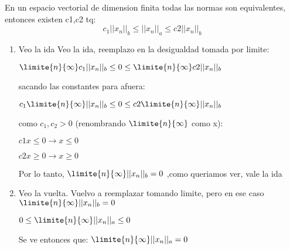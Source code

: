 
\medskip


En un espacio vectorial de dimension finita todas las normas son equivalentes, entonces existen c1,c2 tq:
\begin{equation*}
  c_1||x_n||_b \leq ||x_n||_a \leq c2||x_n||_b
\end{equation*}



\begin{enumerate}[label=(\roman*)]
  \item Veo la ida
  Veo la ida, reemplazo en la desigualdad tomada por limite:

  $\limite{n}{\infty} c_1||x_n||_b \leq 0 \leq \limite{n}{\infty}  c2||x_n||_b $
  
  sacando las constantes para afuera:
  
  $c_1 \limite{n}{\infty} ||x_n||_b \leq 0 \leq  c2 \limite{n}{\infty} ||x_n||_b $
  
  como  $c_1, c_2 > 0$ (renombrando $\limite{n}{\infty}$ como x):
  
  $c1x \leq 0 \rightarrow x \leq 0 $
  
  $c2x \geq 0 \rightarrow x \geq  0 $
  
  Por lo tanto, $\limite{n}{\infty} ||x_n||_b = 0$ ,como queriamos ver, vale la ida

  \item Veo la vuelta.
  Vuelvo a reemplazar tomando limite, pero en ese caso $\limite{n}{\infty} ||x_n||_b = 0$

  $0 \leq \limite{n}{\infty} ||x_n||_a \leq 0$

  Se ve entonces que: $\limite{n}{\infty} ||x_n||_a=0$

\end{enumerate}

\begin{aportes}
  \item {}
\end{aportes}

 

